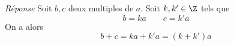 \textit{Réponse}
Soit $b,c$ deux multiples de $a$. Soit $k,k' \in \Z$ tels que \[
b = ka \qquad c= k'a
\]
On a alors \[
b + c = ka + k'a = (k + k')a
\]
